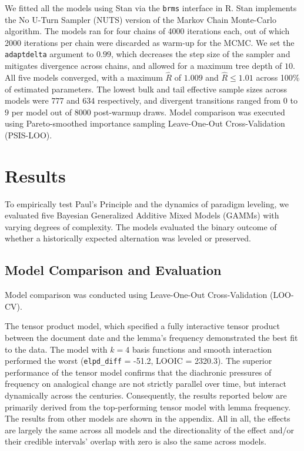 We fitted all the models using Stan \citep{Carpenteretal2017} via the {\tt brms} interface \citep{brms} in R. Stan implements the No U-Turn Sampler (NUTS) version of the Markov Chain Monte-Carlo algorithm. The models ran for four chains of 4000 iterations each, out of which 2000 iterations per chain were discarded as warm-up for the MCMC. We set the {\tt adapt\underline{\phantom{x}}delta} argument to $0.99$, which decreases the step size of the sampler and mitigates divergence across chains, and allowed for a maximum tree depth of $10$. All five models converged, with a maximum $\hat{R}$ of $1.009$ and $\hat{R} \le 1.01$ across 100\% of estimated parameters. The lowest bulk and tail effective sample sizes across models were $777$ and $634$ respectively, and divergent transitions ranged from $0$ to $9$ per model out of $8000$ post-warmup draws. Model comparison was executed using Pareto-smoothed importance sampling Leave-One-Out Cross-Validation (PSIS-LOO).


\pagebreak

\section{Results}

To empirically test Paul's Principle and the dynamics of paradigm leveling, we evaluated five Bayesian Generalized Additive Mixed Models (GAMMs) with varying degrees of complexity. The models evaluated the binary outcome of whether a historically expected alternation was leveled or preserved. 

\subsection{Model Comparison and Evaluation}
Model comparison was conducted using Leave-One-Out Cross-Validation (LOO-CV).

The tensor product model, which specified a fully interactive tensor product between the document date and the lemma's frequency demonstrated the best fit to the data. The model with $k=4$ basis functions and smooth interaction performed the worst (\texttt{elpd\_diff} = -51.2, LOOIC = 2320.3). The superior performance of the tensor model confirms that the diachronic pressures of frequency on analogical change are not strictly parallel over time, but interact dynamically across the centuries. Consequently, the results reported below are primarily derived from the top-performing tensor model with lemma frequency. The results from other models are shown in the appendix. All in all, the effects are largely the same across all models and the directionality of the effect and/or their credible intervals' overlap with zero is also the same across models.

